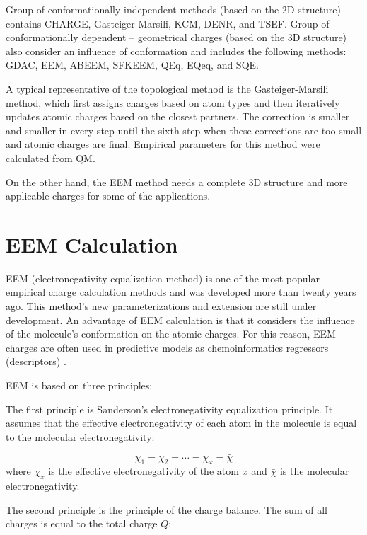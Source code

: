 Group of conformationally independent methods (based on the 2D structure)
contains CHARGE, Gasteiger-Marsili, KCM, DENR, and TSEF. Group of
conformationally dependent -- geometrical charges (based on the 3D structure)
also consider an influence of conformation and includes the following methods:
GDAC, EEM, ABEEM, SFKEEM, QEq, EQeq, and SQE.

A typical representative of the topological method is the Gasteiger-Marsili
method, which first assigns charges based on atom types and then iteratively
updates atomic charges based on the closest partners. The correction is smaller
and smaller in every step until the sixth step when these corrections are too
small and atomic charges are final. Empirical parameters for this method were
calculated from QM. 

On the other hand, the EEM method needs a complete 3D structure and more
applicable charges for some of the applications.

\section{EEM Calculation}

EEM (electronegativity equalization method) \cite{Mortier1986} is one of the
most popular empirical charge calculation methods and was developed more than
twenty years ago. This method's new parameterizations \cite{Mortier1986, Baekelandt1991, 
Bultinck2002, Bultinck2004, Chaves2006, Svobodova2007, Jirouskova2009, Ouyang2009} and
extension \cite{Chaves2006, Yang1997} are still under development. An advantage of EEM
calculation is that it considers the influence of the molecule's conformation
on the atomic charges. For this reason, EEM charges are often used
in predictive models as chemoinformatics regressors (descriptors) \cite{Todoschini2009}.

EEM is based on three principles: 

The first principle is Sanderson's electronegativity equalization principle.
It assumes that the effective electronegativity of each atom in the molecule
is equal to the molecular electronegativity:

\begin{equation}
    \chi_1 = \chi_2 = \cdots = \chi_x = \bar{\chi} 
\end{equation}
where $\chi_x$ is the effective electronegativity of the atom $x$ and
$\bar{\chi}$ is the molecular electronegativity.

The second principle is the principle of the charge balance. The sum of all
charges is equal to the total charge $Q$:

